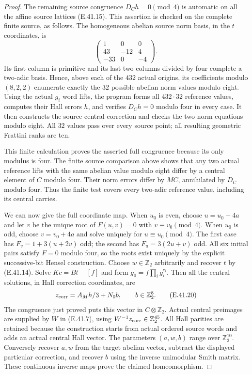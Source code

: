 \begin{proof}
The remaining source congruence
$D_Ch=0\pmod4$ is automatic on all the affine
source lattices \textup{(E.41.15)}.
This assertion is checked on the complete
finite source, as follows.
The homogeneous abelian source norm basis,
in the $t$ coordinates, is
\[
 \begin{pmatrix}
 1&0&0\\
 43&-12&4\\
 -33&0&-4
 \end{pmatrix}.
 \tag{E.41.19}
\]
Its first column is primitive and its last
two columns divided by four complete a
two-adic basis.  Hence, above each of the
$432$ actual origins, its coefficients
modulo $(8,2,2)$ enumerate exactly the
$32$ possible abelian norm values modulo eight.
Using the actual $g_i$ word lifts, the program
forms all $432\cdot32$ reference values,
computes their Hall errors $h$, and verifies
$D_Ch=0$ modulo four in every case.
It then constructs the source central
correction and checks the two norm equations
modulo eight.  All $32$ values pass over
every source point; all resulting geometric
Frattini ranks are ten.

This finite calculation proves the asserted
full congruence because its only modulus is
four.  The finite source comparison above
shows that any two actual reference lifts
with the same abelian value modulo eight
differ by a central element of $C$ modulo
four.  Their norm errors differ by $MC$,
annihilated by $D_C$ modulo four.
Thus the finite test covers every
two-adic reference value, including its
central carries.

We can now give the full coordinate map.
When $u_0$ is even, choose
$u=u_0+4a$ and let $v$ be the unique root
of $F(u,v)=0$ with $v\equiv v_0\pmod4$.
When $u_0$ is odd, choose $v=v_0+4a$
and solve uniquely for $u\equiv u_0\pmod4$.
The first case has
$F_v=1+3(u+2v)$ odd; the second has
$F_u=3(2u+v)$ odd.
All six initial pairs satisfy $F=0$ modulo
four, so the roots exist uniquely by the
explicit successive-bit Hensel construction.
Choose $w\in\mathbb Z_2$ arbitrarily and
recover $t$ by \textup{(E.41.14)}.
Solve $Kc=Bt-[f]$ and form
$g_0=f\prod_i g_i^{c_i}$.
Then all the central solutions, in Hall
correction coordinates, are
\[
       z_{\rm corr}=A_Mh/3+N_0b,\qquad
       b\in\mathbb Z_2^8.
 \tag{E.41.20}
\]
The congruence just proved puts this vector
in $C\otimes\mathbb Z_2$.
Actual central preimages are supplied by
$W$ in \textup{(E.41.7)}, using
$W^{-1}z_{\rm corr}\in\mathbb Z_2^{45}$.
All Hall parities are retained because the
construction starts from actual ordered
source words and adds an actual central
Hall vector.
The parameters $(a,w,b)$ range over
$\mathbb Z_2^{10}$.
Conversely recover $a,w$ from the target
abelian vector, subtract the displayed
particular correction, and recover $b$
using the inverse unimodular Smith matrix.
These continuous inverse maps prove the
claimed homeomorphism.


\end{proof}
